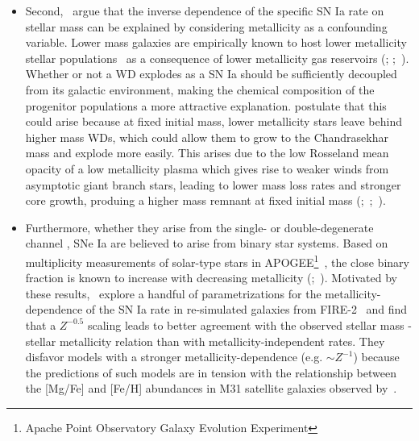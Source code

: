 \documentclass[ms.tex]{subfiles}
\begin{document}
\begin{itemize}
	\item Second,~\citet{Kistler2013} argue that the inverse dependence of the
	specific SN Ia rate on stellar mass can be explained by considering
	metallicity as a confounding variable.
	Lower mass galaxies are empirically known to host lower metallicity stellar
	populations~\citep{Gallazzi2005, Kirby2013} as a consequence of lower
	metallicity gas reservoirs (\citealp{Tremonti2004, Andrews2013};
	\citealp*{Zahid2011};~\citealp{Zahid2014}).
	Whether or not a WD explodes as a SN Ia should be sufficiently decoupled
	from its galactic environment, making the chemical composition of the
	progenitor populations a more attractive explanation.
	\citet{Kistler2013} postulate that this could arise because at fixed
	initial mass, lower metallicity stars leave behind higher mass WDs, which
	could allow them to grow to the Chandrasekhar mass and explode more easily.
	This arises due to the low Rosseland mean opacity of a low metallicity
	plasma which gives rise to weaker winds from asymptotic giant branch stars,
	leading to lower mass loss rates and stronger core growth, produing a
	higher mass remnant at fixed initial mass (\citealp{Umeda1999, Willson2000,
	Marigo2007};~\citealp*{Meng2008};~\citealp{Zhao2012, Kalirai2014}).



	\item Furthermore, whether they arise from the single-
	\citep[e.g.][]{Whelan1973} or double-degenerate channel
	\citep[e.g.][]{Iben1984, Webbink1984}, SNe Ia are believed to arise from
	binary star systems.
	Based on multiplicity measurements of solar-type stars in APOGEE\footnote{
		Apache Point Observatory Galaxy Evolution Experiment
	}~\citep{Majewski2017}, the close binary fraction is known to increase
	with decreasing metallicity (\citealp{Badenes2018};~\citealp*{Moe2019}).
	Motivated by these results,~\citet{Gandhi2022} explore a handful of
	parametrizations for the metallicity-dependence of the SN Ia rate in
	re-simulated galaxies from FIRE-2~\citep{Hopkins2018} and find that a
	$Z^{-0.5}$ scaling leads to better agreement with the observed stellar
	mass - stellar metallicity relation than with metallicity-independent
	rates.
	They disfavor models with a stronger metallicity-dependence (e.g.
	$\sim Z^{-1}$) because the predictions of such models are in tension
	with the relationship between the [Mg/Fe] and [Fe/H] abundances in M31
	satellite galaxies observed by~\citet*{Vargas2014}.


\end{itemize}
\end{document}
